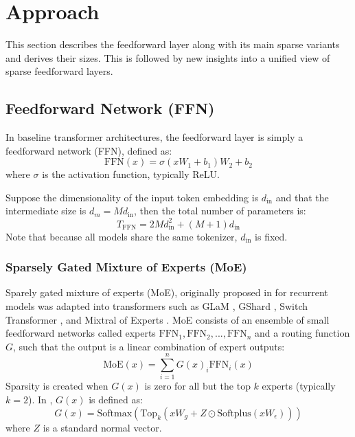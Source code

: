 \section{Approach}
\label{sec:approach}
This section describes the feedforward layer along with its main sparse variants and derives their sizes. This is followed by new insights into a unified view of sparse feedforward layers.

\subsection{Feedforward Network (FFN)}
In baseline transformer architectures, the feedforward layer is simply a feedforward network (FFN), defined as:
\begin{equation}
    \label{eq:ffn}
    \text{FFN}(x)=\sigma(xW_1+b_1)W_2+b_2
\end{equation}
where $\sigma$ is the activation function, typically ReLU. 


Suppose the dimensionality of the input token embedding is $d_\text{in}$ and that the intermediate size is $d_m=Md_\text{in}$, then the total number of parameters is: 
\begin{equation}
 T_\text{FFN} = 2Md_\text{in}^2 + (M+1)d_\text{in}  
\end{equation}
Note that because all models share the same tokenizer, $d_\text{in}$ is fixed.

\subsubsection{Sparsely Gated Mixture of Experts (MoE)}
Sparely gated mixture of experts (MoE), originally proposed in \cite{shazeer_outrageously_2017} for recurrent models was adapted into transformers such as GLaM \cite{du_glam_2022}, GShard \cite{lepikhin_gshard_2020}, Switch Transformer \cite{fedus_switch_2022}, and Mixtral of Experts \cite{jiang_mixtral_2024}. MoE consists of an ensemble of small feedforward networks called experts $\text{FFN}_1, \text{FFN}_2,...,\text{FFN}_n$ and a routing function $G$, such that the output is a linear combination of expert outputs:
\begin{equation}
    \text{MoE}(x) = \sum_{i=1}^n G(x)_i \text{FFN}_i(x)
\end{equation}
Sparsity is created when $G(x)$ is zero for all but the top $k$ experts (typically $k=2$). In \cite{shazeer_outrageously_2017}, $G(x)$ is defined as:
\begin{equation}
    \label{eq:routing}
    G(x) = \text{Softmax}(\text{Top}_k(xW_g+Z\odot \text{Softplus}(xW_\epsilon)))
\end{equation}
where $Z$ is a standard normal vector.

